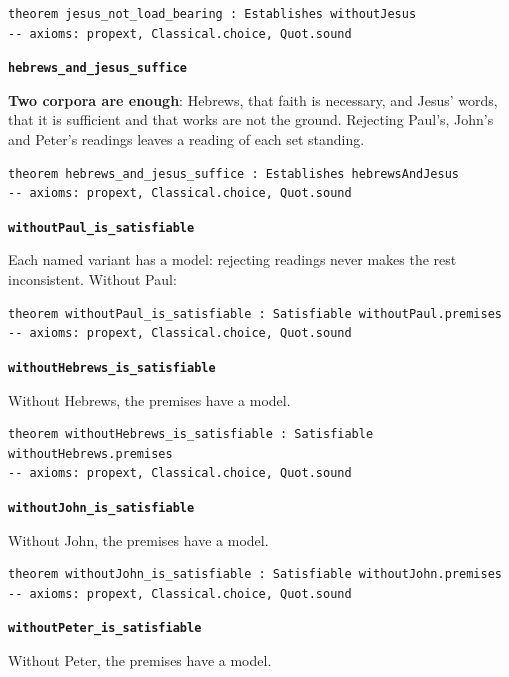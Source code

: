 \documentclass[11pt]{article}
\begin{document}
{\small\begin{verbatim}
theorem jesus_not_load_bearing : Establishes withoutJesus
-- axioms: propext, Classical.choice, Quot.sound
\end{verbatim}}
\par\medskip\noindent\textbf{\texttt{hebrews\_\allowbreak{}and\_\allowbreak{}jesus\_\allowbreak{}suffice}}\par\nobreak\noindent
\textbf{Two corpora are enough}: Hebrews, that faith is necessary, and Jesus' words, that it is sufficient and that works are not the ground. Rejecting Paul's, John's and Peter's readings leaves a reading of each set standing.

{\small\begin{verbatim}
theorem hebrews_and_jesus_suffice : Establishes hebrewsAndJesus
-- axioms: propext, Classical.choice, Quot.sound
\end{verbatim}}
\par\medskip\noindent\textbf{\texttt{without\allowbreak{}Paul\_\allowbreak{}is\_\allowbreak{}satisfiable}}\par\nobreak\noindent
Each named variant has a model: rejecting readings never makes the rest inconsistent. Without Paul:

{\small\begin{verbatim}
theorem withoutPaul_is_satisfiable : Satisfiable withoutPaul.premises
-- axioms: propext, Classical.choice, Quot.sound
\end{verbatim}}
\par\medskip\noindent\textbf{\texttt{without\allowbreak{}Hebrews\_\allowbreak{}is\_\allowbreak{}satisfiable}}\par\nobreak\noindent
Without Hebrews, the premises have a model.

{\small\begin{verbatim}
theorem withoutHebrews_is_satisfiable : Satisfiable withoutHebrews.premises
-- axioms: propext, Classical.choice, Quot.sound
\end{verbatim}}
\par\medskip\noindent\textbf{\texttt{without\allowbreak{}John\_\allowbreak{}is\_\allowbreak{}satisfiable}}\par\nobreak\noindent
Without John, the premises have a model.

{\small\begin{verbatim}
theorem withoutJohn_is_satisfiable : Satisfiable withoutJohn.premises
-- axioms: propext, Classical.choice, Quot.sound
\end{verbatim}}
\par\medskip\noindent\textbf{\texttt{without\allowbreak{}Peter\_\allowbreak{}is\_\allowbreak{}satisfiable}}\par\nobreak\noindent
Without Peter, the premises have a model.
\end{document}
